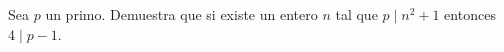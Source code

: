 \begin{problem}
    Sea $p$ un primo. Demuestra que si existe un entero $n$ tal que $p \mid n^2+1$ entonces $4\mid p-1$.
    \label{25EN2_2_3}
\end{problem}